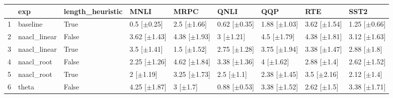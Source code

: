 \begin{table}[ht]
\centering
\begin{tabular}{rllllllll}
  \hline
 & exp & length_heuristic & MNLI & MRPC & QNLI & QQP & RTE & SST2 \\ 
  \hline
1 & baseline & True & 0.5 [$\pm$0.25] & 2.5 [$\pm$1.66] & 0.62 [$\pm$0.35] & 1.88 [$\pm$1.03] & 3.62 [$\pm$1.54] & 1.25 [$\pm$0.66] \\ 
  2 & naacl_linear & False & 3.62 [$\pm$1.43] & 4.38 [$\pm$1.93] & 3 [$\pm$1.21] & 4.5 [$\pm$1.79] & 4.38 [$\pm$1.81] & 3.12 [$\pm$1.63] \\ 
  3 & naacl_linear & True & 3.5 [$\pm$1.41] & 1.5 [$\pm$1.52] & 2.75 [$\pm$1.28] & 3.75 [$\pm$1.94] & 3.38 [$\pm$1.47] & 2.88 [$\pm$1.8] \\ 
  4 & naacl_root & False & 2.25 [$\pm$1.26] & 4.62 [$\pm$1.84] & 3.38 [$\pm$1.36] & 4 [$\pm$1.62] & 2.88 [$\pm$1.4] & 2.62 [$\pm$1.52] \\ 
  5 & naacl_root & True & 2 [$\pm$1.19] & 3.25 [$\pm$1.73] & 2.5 [$\pm$1.1] & 2.38 [$\pm$1.45] & 3.5 [$\pm$2.16] & 2.12 [$\pm$1.4] \\ 
  6 & theta & False & 4.25 [$\pm$1.87] & 3 [$\pm$1.7] & 0.88 [$\pm$0.53] & 3.38 [$\pm$1.52] & 2.62 [$\pm$1.5] & 3.38 [$\pm$1.71] \\ 
   \hline
\end{tabular}
\end{table}

